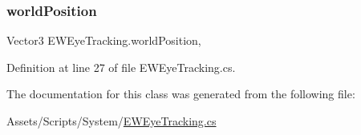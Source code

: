 \mbox{\label{class_e_w_eye_tracking_ada8347aa7a674825995b36f3df32930f}} 
\subsubsection{\texorpdfstring{world\+Position}{worldPosition}}
{\footnotesize\ttfamily Vector3 E\+W\+Eye\+Tracking.\+world\+Position\hspace{0.3cm}{\ttfamily [static]}, {\ttfamily [get]}}



Definition at line 27 of file E\+W\+Eye\+Tracking.\+cs.



The documentation for this class was generated from the following file\+:\begin{DoxyCompactItemize}
\item 
Assets/\+Scripts/\+System/\mbox{\hyperlink{_e_w_eye_tracking_8cs}{E\+W\+Eye\+Tracking.\+cs}}\end{DoxyCompactItemize}
